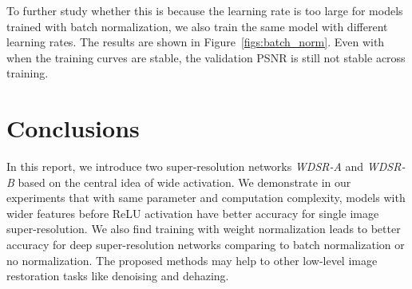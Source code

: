 \documentclass{article}
\begin{document}
To further study whether this is because the learning rate is too large for models trained with batch normalization, we also train the same model with different learning rates. The results are shown in Figure~\ref{figs:batch_norm}. Even with  when the training curves are stable, the validation PSNR is still not stable across training.  
\section{Conclusions}

In this report, we introduce two super-resolution networks \textit{WDSR-A} and \textit{WDSR-B} based on the central idea of wide activation. We demonstrate in our experiments that with same parameter and computation complexity, models with wider features before ReLU activation have better accuracy for single image super-resolution. We also find training with weight normalization leads to better accuracy for deep super-resolution networks comparing to batch normalization or no normalization. The proposed methods may help to other low-level image restoration tasks like denoising and dehazing.

\printbibliography
\end{document}
